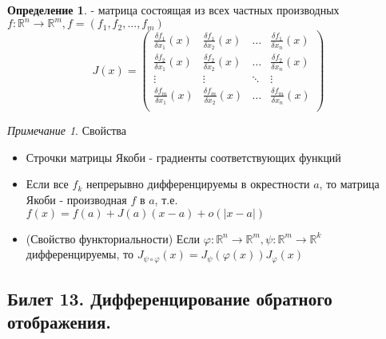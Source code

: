 \documentclass[a4paper]{article}
\theoremstyle{indented}
\theoremstyle{definition}
\newtheorem{defn}{Определение}
\theoremstyle{remark}
\newtheorem{remark}{Примечание}
\begin{document}
\begin{defn}
     - матрица состоящая из всех частных производных
    $f: \mathbb{R}^n \to \mathbb{R}^m, f=(f_1, f_2, ... , f_m)$
    \[
        J(x) =
        \begin{pmatrix}
            \frac{\delta f_1}{\delta x_1}(x) & \frac{\delta f_1}{\delta x_2}(x) & \dots  & \frac{\delta f_1}{\delta x_n}(x) \\
            \frac{\delta f_2}{\delta x_1}(x) & \frac{\delta f_2}{\delta x_2}(x) & \dots  & \frac{\delta f_2}{\delta x_n}(x) \\
            \vdots                           & \vdots                           & \ddots & \vdots                           \\
            \frac{\delta f_m}{\delta x_1}(x) & \frac{\delta f_m}{\delta x_2}(x) & \dots  & \frac{\delta f_m}{\delta x_n}(x) \\
        \end{pmatrix}
    \]
\end{defn}

\begin{remark} Свойства
    \begin{itemize}
        \item Строчки матрицы Якоби - градиенты соответствующих функций
        \item Если все $f_k$ непрерывно дифференцируемы в окрестности $a$, то матрица Якоби - производная $f$ в $a$,
              т.е. $f(x)=f(a)+J(a)(x-a)+o(|x-a|)$
        \item (Свойство функториальности) Если
              $\varphi: \mathbb{R}^n \to \mathbb{R}^m, \psi: \mathbb{R}^m \to \mathbb{R}^k$
              дифференцируемы, то $J_{\psi \circ \varphi}(x) = J_\psi(\varphi(x))J_\varphi(x)$
    \end{itemize}
\end{remark}

\subsection{Билет 13. Дифференцирование обратного отображения.}
\end{document}
